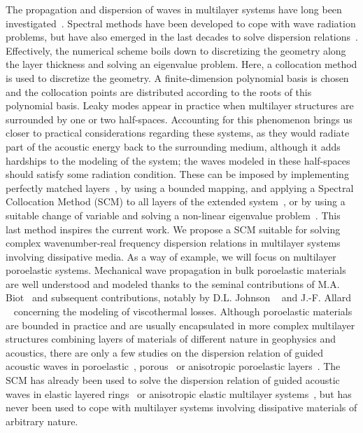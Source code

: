 The propagation and dispersion of waves in multilayer systems have long been investigated~\cite{lowe1995,haskell1953}. Spectral methods have been developed to cope with wave radiation problems, but have also emerged in the last decades to solve dispersion relations~\cite{pagneux2001}. Effectively, the numerical scheme boils down to discretizing the geometry along the layer thickness and solving an eigenvalue problem. Here, a collocation method is used to discretize the geometry. A finite-dimension polynomial basis is chosen and the collocation points are distributed according to the roots of this polynomial basis. Leaky modes appear in practice when multilayer structures are surrounded by one or two half-spaces. Accounting for this phenomenon brings us closer to practical considerations regarding these systems, as they would radiate part of the acoustic energy back to the surrounding medium, although it adds hardships to the modeling of the system; the waves modeled in these half-spaces should satisfy some radiation condition. These can be imposed by implementing perfectly matched layers~\cite{gallezot2017}, by using a bounded mapping, and applying a Spectral Collocation Method (SCM) to all layers of the extended system~\cite{georgiades2022}, or by using a suitable change of variable and solving a non-linear eigenvalue problem~\cite{kiefer2019}. This last method inspires the current work. We propose a SCM suitable for solving complex wavenumber-real frequency dispersion relations in multilayer systems involving dissipative media. As a way of example, we will focus on multilayer poroelastic systems. Mechanical wave propagation in bulk poroelastic materials are well understood and modeled thanks to the seminal contributions of M.A. Biot~\cite{biot1956,biot1956a,biot1962,biot1962a} and subsequent contributions, notably by D.L. Johnson \etal~\cite{johnson1987} and J.-F. Allard \etal~\cite{champoux1991,lafarge1997} concerning the modeling of viscothermal losses. Although poroelastic materials are bounded in practice and are usually encapsulated in more complex multilayer structures combining layers of materials of different nature in geophysics and acoustics, there are only a few studies on the dispersion relation of guided acoustic waves in poroelastic~\cite{weisser2016, boeckx2005, belloncle2003}, porous~\cite{allard2004,groby2008} or anisotropic poroelastic layers~\cite{seyfaddini2021}. The SCM has already been used to solve the dispersion relation of guided acoustic waves in elastic layered rings~\cite{adamou2004, karpfinger2008} or anisotropic elastic multilayer systems~\cite{quintanilla2015}, but has never been used to cope with multilayer systems involving dissipative materials of arbitrary nature.\\ 
    
